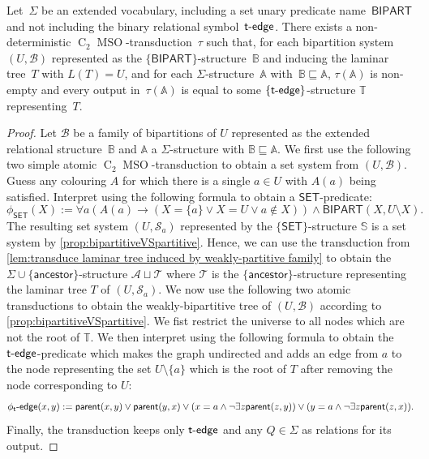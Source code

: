 \documentclass{lmcs} %
\newcommand{\MSO}{\ensuremath{\operatorname{MSO}}\xspace}
\newcommand{\CMSO}[1][]{\ensuremath{\C[#1]{\!\!}\MSO}\xspace}
\newcommand{\C}[1][]{\ensuremath{\operatorname{C}_{#1}}\xspace}
\newcommand{\ancestor}{\mathsf{ancestor}}
\newcommand{\parent}{\ensuremath{\mathsf{parent}}\xspace}
\newcommand{\tedge}{\ensuremath{\mathsf{t}\text-\mathsf{edge}}\xspace}
\newcommand{\SET}{\ensuremath{\mathsf{SET}}\xspace}
\newcommand{\BIPARTITION}{\ensuremath{\mathsf{BIPART}}\xspace}
\renewcommand{\implies}{\rightarrow}
\begin{document}
\begin{lem}
    \label{lem:transduce laminar tree induced by weakly-bipartitive family}
    Let~$\Sigma$ be an extended vocabulary,
    including a set unary predicate name~$\BIPARTITION$
    and not including the binary relational symbol~$\tedge$.
    There exists a non-deterministic \CMSO[2]-transduction~$\tau$
    such that,
    for each bipartition system~$(U,\mathcal{B})$
    represented as the $\{\BIPARTITION\}$-structure~$\mathbb{B}$
    and inducing the laminar tree~$T$ with ${L(T)=U}$,
    and for each $\Sigma$-structure~$\mathbb{A}$ with~$\mathbb{B}\sqsubseteq\mathbb{A}$,
    $\tau(\mathbb{A})$ is non-empty
    and every output in~$\tau(\mathbb{A})$ is equal to some $\{\tedge\}$-structure $\mathbb{T}$ representing~$T$.
\end{lem}
\begin{proof}
    Let $\mathcal{B}$ be a family of bipartitions of $U$ represented as the extended relational structure~$\mathbb{B}$ and $\mathbb{A}$ a $\Sigma$-structure
    with $\mathbb{B}\sqsubseteq \mathbb{A}$. We first use the following two simple atomic \CMSO[2]-transduction to obtain a set system from $(U,\mathcal{B})$.
    Guess any colouring $A$ for which there is a single $a\in U$ with $A(a)$ being satisfied. Interpret using the following formula to obtain a $\SET$-predicate:
    $$\phi_\SET(X):=\forall a (A(a)\implies (X=\{a\} \lor X=U \lor a\notin X))\land \BIPARTITION(X,U\setminus X).$$
    The resulting set system $(U,\mathcal{S}_a)$ represented by the $\{\SET\}$-structure $\mathbb{S}$ is a set system by \autoref{prop:bipartitiveVSpartitive}. Hence, we can use the transduction from \autoref{lem:transduce laminar tree induced by weakly-partitive family} to obtain the $\Sigma\cup\{\ancestor\}$-structure $\mathcal{A}\sqcup \mathcal{T}$ where $\mathcal{T}$ is the $\{\ancestor\}$-structure representing the laminar tree $T$ of $(U,\mathcal{S}_a)$. We now use the following two atomic transductions to obtain the weakly-bipartitive tree of $(U,\mathcal{B})$ according to \autoref{prop:bipartitiveVSpartitive}. We fist restrict the universe to all nodes which are not the root of $\mathbb{T}$. We then interpret using the following formula to obtain the $\tedge$-predicate which makes the graph undirected and adds an edge from $a$ to the node representing the set $U\setminus \{a\}$ which is the root of $T$ after removing the node corresponding to $U$:
    $$\phi_\tedge(x,y):=\parent(x,y)\lor \parent(y,x)\lor (x=a \land \lnot \exists z \parent(z,y))\lor (y=a \land \lnot \exists z \parent(z,x)).$$
    Finally, the transduction keeps only $\tedge$ and any $Q\in \Sigma$
    as relations for its output.
\end{proof}
\end{document}
